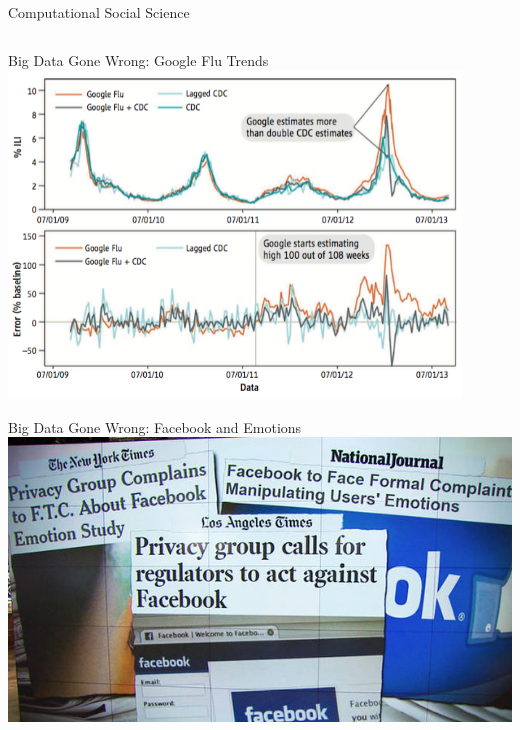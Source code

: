 \documentclass{beamer}
\begin{document}
\begin{frame}{Computational Social Science}
\begin{columns}
\begin{column}{0.5\textwidth}
    \end{column}
  \end{columns}
\end{frame}

\begin{frame}{Big Data Gone Wrong: Google Flu Trends}
  \includegraphics[width=0.9\textwidth]{img/lazer_etal_2014-f1.png}
\end{frame}

\begin{frame}{Big Data Gone Wrong: Facebook and Emotions}
  \includegraphics[width=\textwidth]{img/fb-emotion-study.jpg}
\end{frame}
\end{document}
